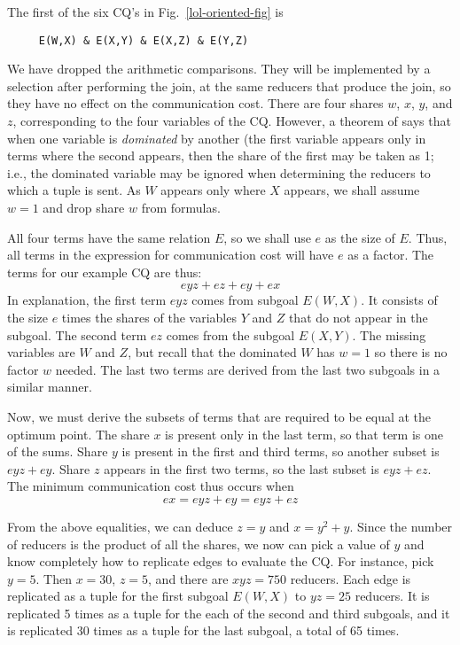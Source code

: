 \begin{example}
\label{lol-opt-ex}
The first of the six CQ's in Fig.~\ref{lol-oriented-fig} is

\begin{verbatim}
     E(W,X) & E(X,Y) & E(X,Z) & E(Y,Z)
\end{verbatim}
We have dropped the arithmetic comparisons.  They will be implemented by a selection after performing the join, at the same reducers that produce the join, so they have no effect on the communication cost.  There are four shares $w$, $x$, $y$, and $z$, corresponding to the four variables of the CQ.  However, a theorem of \cite{AU10} says that when one variable is {\em dominated} by another (the first variable appears only in terms where the second appears, then the share of the first may be taken as 1; i.e., the dominated variable may be ignored when determining the reducers to which a tuple is sent.  As $W$ appears only where $X$ appears, we shall assume $w=1$ and drop share $w$ from formulas.

All four terms have the same relation $E$, so we shall use $e$ as the size of $E$.  Thus, all terms in the expression for communication cost will have $e$ as a factor.  The terms for our example CQ are thus:
$$eyz + ez + ey + ex$$
In explanation, the first term $eyz$ comes from subgoal $E(W,X)$.  It consists of the size $e$ times the shares of the variables $Y$ and $Z$ that do not appear in the subgoal.  The second term $ez$ comes from the subgoal $E(X,Y)$.  The missing variables are $W$ and $Z$, but recall that the dominated $W$ has $w=1$ so there is no factor $w$ needed.  The last two terms are derived from the last two subgoals in a similar manner.

Now, we must derive the subsets of terms that are required to be equal at the optimum point.  The share $x$ is present only in the last term, so that term is one of the sums.  Share $y$ is present in the first and third terms, so another subset is $eyz+ey$.  Share $z$ appears in the first two terms, so the last subset is $eyz+ez$.  The minimum communication cost thus occurs when
$$ex = eyz+ey = eyz+ez$$

From the above equalities, we can deduce $z=y$ and $x=y^2+y$.  Since the number of reducers is the product of all the shares, we now can pick a value of $y$ and know completely how to replicate edges to evaluate the CQ.  For instance, pick $y=5$.  Then $x=30$, $z=5$, and there are $xyz=750$ reducers.  Each edge is replicated as a tuple for the first subgoal $E(W,X)$ to $yz=25$ reducers.  It is replicated 5 times as a tuple for the each of the second and third subgoals, and it is replicated 30 times as a tuple for the last subgoal, a total of 65 times.
\end{example}


